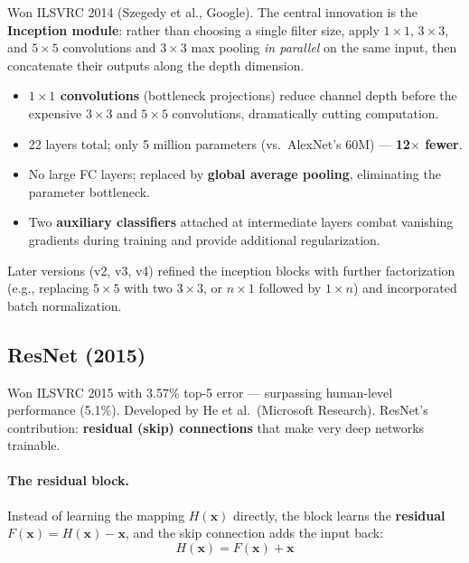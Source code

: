 \documentclass[11pt,a4paper]{article}
\theoremstyle{definition}
\theoremstyle{plain}
\theoremstyle{remark}
\begin{document}
Won ILSVRC 2014 (Szegedy et al., Google). The central innovation is the \textbf{Inception module}: rather than choosing a single filter size, apply $1\times1$, $3\times3$, and $5\times5$ convolutions and $3\times3$ max pooling \emph{in parallel} on the same input, then concatenate their outputs along the depth dimension.

\begin{itemize}
    \item \textbf{$1 \times 1$ convolutions} (bottleneck projections) reduce channel depth before the expensive $3\times3$ and $5\times5$ convolutions, dramatically cutting computation.
    \item 22 layers total; only 5 million parameters (vs.\ AlexNet's 60M) --- \textbf{12$\times$ fewer}.
    \item No large FC layers; replaced by \textbf{global average pooling}, eliminating the parameter bottleneck.
    \item Two \textbf{auxiliary classifiers} attached at intermediate layers combat vanishing gradients during training and provide additional regularization.
\end{itemize}

Later versions (v2, v3, v4) refined the inception blocks with further factorization (e.g., replacing $5\times5$ with two $3\times3$, or $n\times1$ followed by $1\times n$) and incorporated batch normalization.

\subsection{ResNet (2015)}

Won ILSVRC 2015 with 3.57\% top-5 error --- surpassing human-level performance (5.1\%). Developed by He et al.\ (Microsoft Research). ResNet's contribution: \textbf{residual (skip) connections} that make very deep networks trainable.

\paragraph{The residual block.} Instead of learning the mapping $H(\mathbf{x})$ directly, the block learns the \textbf{residual} $F(\mathbf{x}) = H(\mathbf{x}) - \mathbf{x}$, and the skip connection adds the input back:
\[
    H(\mathbf{x}) = F(\mathbf{x}) + \mathbf{x}
\]
\end{document}

